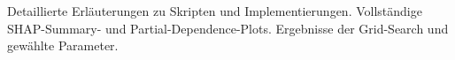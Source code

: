 \startAnhang
\listofanhang
\clearpage
{}



Detaillierte Erläuterungen zu Skripten und Implementierungen.  
Vollständige SHAP-Summary- und Partial-Dependence-Plots.  
Ergebnisse der Grid-Search und gewählte Parameter.  
